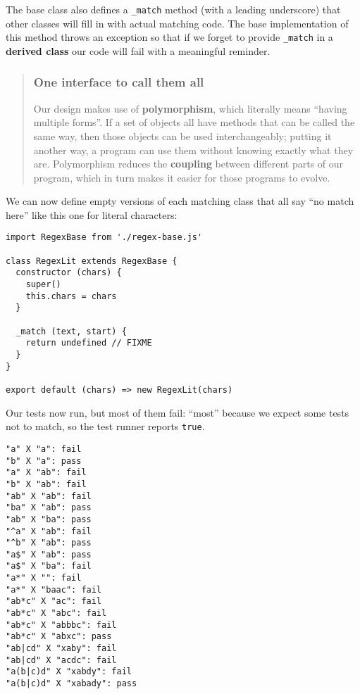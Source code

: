\documentclass[krantzl]{krantz}
\newcommand{\glossref}[1]{\textbf{#1}}
\newenvironment{callout}{\savenotes\begin{tBox}\begin{quotation}\toggletrue{inbox}\renewcommand{\thempfootnote}{\arabic{footnote}}}{\end{quotation}\vspace{\baselineskip}\end{tBox}\togglefalse{inbox}\spewnotes}
\begin{document}
\noindent The base class also defines a \texttt{\_match} method (with a leading underscore)
that other classes will fill in with actual matching code.
The base implementation of this method throws an exception
so that if we forget to provide \texttt{\_match} in a \glossref{derived class}
our code will fail with a meaningful reminder.

\begin{callout}


\subsubsection*{One interface to call them all}


Our design makes use of \glossref{polymorphism},
which literally means “having multiple forms”.
If a set of objects all have methods that can be called the same way,
then those objects can be used interchangeably;
putting it another way,
a program can use them without knowing exactly what they are.
Polymorphism reduces the \glossref{coupling} between different parts of our program,
which in turn makes it easier for those programs to evolve.

\end{callout}


We can now define empty versions of each matching class that all say “no match here”
like this one for literal characters:


\begin{lstlisting}[frame=tblr]
import RegexBase from './regex-base.js'

class RegexLit extends RegexBase {
  constructor (chars) {
    super()
    this.chars = chars
  }

  _match (text, start) {
    return undefined // FIXME
  }
}

export default (chars) => new RegexLit(chars)
\end{lstlisting}



\noindent Our tests now run, but most of them fail:
“most” because we expect some tests not to match,
so the test runner reports \texttt{true}.


\begin{lstlisting}[frame=tblr,backgroundcolor=\color{black!5}]
"a" X "a": fail
"b" X "a": pass
"a" X "ab": fail
"b" X "ab": fail
"ab" X "ab": fail
"ba" X "ab": pass
"ab" X "ba": pass
"^a" X "ab": fail
"^b" X "ab": pass
"a$" X "ab": pass
"a$" X "ba": fail
"a*" X "": fail
"a*" X "baac": fail
"ab*c" X "ac": fail
"ab*c" X "abc": fail
"ab*c" X "abbbc": fail
"ab*c" X "abxc": pass
"ab|cd" X "xaby": fail
"ab|cd" X "acdc": fail
"a(b|c)d" X "xabdy": fail
"a(b|c)d" X "xabady": pass
\end{lstlisting}
\end{document}
